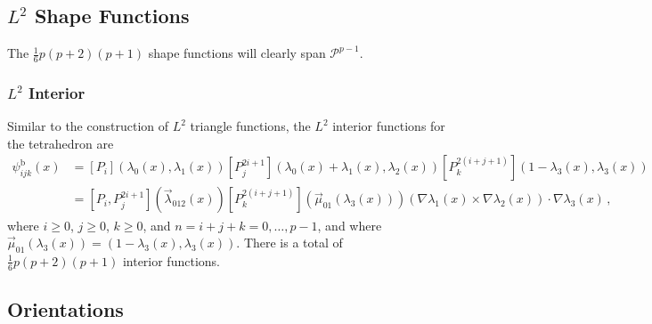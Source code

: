 \subsection{\texorpdfstring{$L^2$}{L2} Shape Functions}
The $\frac{1}{6}p(p+2)(p+1)$ shape functions will clearly span $\mathcal{P}^{p-1}$.

\subsubsection{\texorpdfstring{$L^2$}{L2} Interior}

Similar to the construction of $L^2$ triangle functions, the $L^2$ interior functions for the tetrahedron are
\begin{equation}
	\begin{aligned}
		\psi_{ijk}^\mathrm{b}(x)&=[P_i](\lambda_0(x),\lambda_1(x))[P_j^{2i+1}](\lambda_0(x)\!+\!\lambda_1(x),\lambda_2(x))
			[P_k^{2(i+j+1)}](1\!-\!\lambda_3(x),\lambda_3(x))\\
		&=[P_i,P_j^{2i+1}](\vec{\lambda}_{012}(x))[P_k^{2(i+j+1)}](\vec{\mu}_{01}(\lambda_3(x)))
			(\nabla\lambda_1(x)\!\!\times\!\!\nabla\lambda_2(x))\!\cdot\!\nabla\lambda_3(x)\,,
	\end{aligned}
\end{equation}
where $i\geq0$, $j\geq0$, $k\geq0$, and $n=i+j+k=0,\ldots,p-1$, and where $\vec{\mu}_{01}(\lambda_3(x))=(1-\lambda_3(x),\lambda_3(x))$. There is a total of $\frac{1}{6}p(p+2)(p+1)$ interior functions.

%
%

\subsection{Orientations}
\label{sec:TetOrientations}

